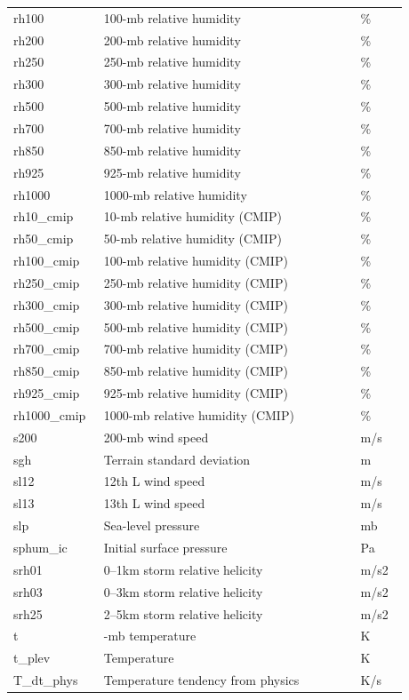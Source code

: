 \documentclass[11pt,fleqn]{report}              %
\begin{document}
\begin{enumerate}
\begin{enumerate}
{\begin{longtable}{p{0.17\linewidth} | p{0.6\linewidth} | p{0.11\linewidth} }
  rh100 & 100-mb relative humidity & \% \\
  rh200 & 200-mb relative humidity & \% \\
  rh250 & 250-mb relative humidity & \% \\
  rh300 & 300-mb relative humidity & \% \\
  rh500 & 500-mb relative humidity & \% \\
  rh700 & 700-mb relative humidity & \% \\
  rh850 & 850-mb relative humidity & \% \\
  rh925 & 925-mb relative humidity & \% \\
  rh1000 & 1000-mb relative humidity & \% \\
  rh10\_cmip & 10-mb relative humidity (CMIP) & \% \\
  rh50\_cmip & 50-mb relative humidity (CMIP) & \% \\
  rh100\_cmip & 100-mb relative humidity (CMIP) & \% \\
  rh250\_cmip & 250-mb relative humidity (CMIP) & \% \\
  rh300\_cmip & 300-mb relative humidity (CMIP) & \% \\
  rh500\_cmip & 500-mb relative humidity (CMIP) & \% \\
  rh700\_cmip & 700-mb relative humidity (CMIP) & \% \\
  rh850\_cmip & 850-mb relative humidity (CMIP) & \% \\
  rh925\_cmip & 925-mb relative humidity (CMIP) & \% \\
  rh1000\_cmip & 1000-mb relative humidity (CMIP) & \% \\  
  s200 & 200-mb wind speed & m/s \\
  sgh & Terrain standard deviation & m \\
  sl12 & 12th L wind speed & m/s \\
  sl13 & 13th L wind speed & m/s \\ 
  slp & Sea-level pressure & mb \\
  sphum\_ic & Initial surface pressure & Pa \\
  srh01 & 0--1km storm relative helicity & m/s2 \\
  srh03 & 0--3km storm relative helicity & m/s2 \\
  srh25 & 2--5km storm relative helicity & m/s2 \\
  t & -mb temperature & K \\
  t\_plev & Temperature & K \\
  T\_dt\_phys & Temperature tendency from physics & K/s \\

\end{longtable}}
\end{enumerate}
\end{enumerate}
\end{document}
